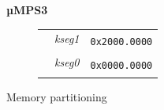 \documentclass{beamer}
\begin{document}
\begin{frame}
\begin{center}
\begin{minipage}{0.45\textwidth}
\begin{block}{\textbf{µMPS3}}
\begin{figure}[h]
\begin{tabular}{rcl}
						\multicolumn{1}{r|}{}                                                               & \multicolumn{1}{c|}{\multirow{-2}{*}{{\cellcolor{nord9}\scriptsize \textit{kseg1}}}}          & \multirow{2}{*}{\texttt{{\tiny 0x2000.0000}}} \\ \hhline{--~}
						\multicolumn{1}{r|}{\multirow{2}{*}{\rotatebox{90}{{\scriptsize\!\!\!\!\!BIOS}}}}   & \multicolumn{1}{c|}{\cellcolor{nord7}}                                                        &                                               \\
						\multicolumn{1}{r|}{}                                                               & \multicolumn{1}{c|}{\multirow{-2}{*}{{\cellcolor{nord7}\scriptsize \textit{kseg0}}}}          & \multirow{2}{*}{\texttt{{\tiny 0x0000.0000}}} \\ \cline{2-2}
						\multicolumn{1}{l}{}                                                                &                                                                                               &
					\end{tabular}
				\end{figure}
				\begin{itemize}
					{\small \item Memory partitioning}
				\end{itemize}
			\end{block}
		\end{minipage}
	\end{center}
\end{frame}
\end{document}
